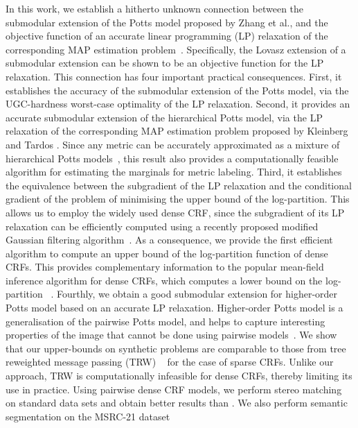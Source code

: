 In this work, we establish a hitherto unknown connection between the submodular
extension of the Potts model proposed by Zhang et al.\citep{zhang2015higher}, and the
objective function of an accurate linear programming (LP) relaxation of the
corresponding MAP estimation problem~\citep{kleinberg2002approximation}. Specifically, the Lovasz extension of a submodular extension can be shown to be an objective function for the LP relaxation. This
connection has four important practical consequences. First, it establishes
the accuracy of the submodular extension of the Potts model, via the
UGC-hardness worst-case optimality of the LP relaxation. Second, it provides an
accurate submodular extension of the hierarchical Potts model, via the LP
relaxation of the corresponding MAP estimation problem proposed
by Kleinberg and Tardos \citep{kleinberg2002approximation}. Since any metric can be accurately
approximated as a mixture of hierarchical Potts
models~\citep{bartal1996probabilistic, bartal1998approximating}, this result
also provides a computationally feasible algorithm for estimating the marginals
for metric labeling. Third, it establishes the equivalence between the
subgradient of the LP relaxation and the conditional gradient of the problem of
minimising the upper bound of the log-partition. This allows us to employ the
widely used dense CRF, since the subgradient of its LP relaxation can be
efficiently computed using a recently proposed modified Gaussian filtering
algorithm~\citep{ajanthan2017efficient}. As a consequence, we provide the first
efficient algorithm to compute an upper bound of the log-partition function of
dense CRFs. This provides complementary information to the popular mean-field
inference algorithm for dense CRFs, which computes a lower bound on the
log-partition ~\citep{koltun2011efficient}. Fourthly, we obtain a good 
submodular extension for higher-order Potts model based on an accurate LP
relaxation. Higher-order Potts model is a generalisation of the pairwise Potts
model, and helps to capture interesting properties of the image that cannot be
done using pairwise models~\citep{vineet2014filter, kohli2009robust}. We show that our upper-bounds on synthetic problems are comparable to those from tree reweighted message passing (TRW)
~\citep{wainwright2005new} for the case of sparse CRFs. Unlike our approach,
TRW is computationally infeasible for dense CRFs, thereby limiting its use in
practice. Using pairwise dense CRF models, we perform stereo matching on standard
data sets and obtain better results than \citep{koltun2011efficient}. We also perform semantic segmentation on the MSRC-21 dataset 

